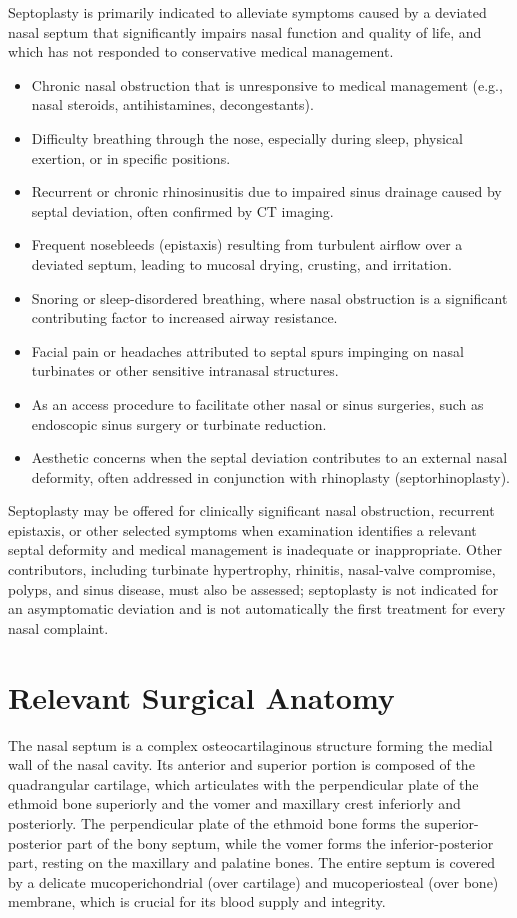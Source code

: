 Septoplasty is primarily indicated to alleviate symptoms caused by a deviated nasal septum that significantly impairs nasal function and quality of life, and which has not responded to conservative medical management.

\begin{itemize}
  \item Chronic nasal obstruction that is unresponsive to medical management (e.g., nasal steroids, antihistamines, decongestants).
  \item Difficulty breathing through the nose, especially during sleep, physical exertion, or in specific positions.
  \item Recurrent or chronic rhinosinusitis due to impaired sinus drainage caused by septal deviation, often confirmed by CT imaging.
  \item Frequent nosebleeds (epistaxis) resulting from turbulent airflow over a deviated septum, leading to mucosal drying, crusting, and irritation.
  \item Snoring or sleep-disordered breathing, where nasal obstruction is a significant contributing factor to increased airway resistance.
  \item Facial pain or headaches attributed to septal spurs impinging on nasal turbinates or other sensitive intranasal structures.
  \item As an access procedure to facilitate other nasal or sinus surgeries, such as endoscopic sinus surgery or turbinate reduction.
  \item Aesthetic concerns when the septal deviation contributes to an external nasal deformity, often addressed in conjunction with rhinoplasty (septorhinoplasty).
\end{itemize}

Septoplasty may be offered for clinically significant nasal obstruction, recurrent epistaxis, or other selected symptoms when examination identifies a relevant septal deformity and medical management is inadequate or inappropriate. Other contributors, including turbinate hypertrophy, rhinitis, nasal-valve compromise, polyps, and sinus disease, must also be assessed; septoplasty is not indicated for an asymptomatic deviation and is not automatically the first treatment for every nasal complaint.

\section*{Relevant Surgical Anatomy}
The nasal septum is a complex osteocartilaginous structure forming the medial wall of the nasal cavity. Its anterior and superior portion is composed of the quadrangular cartilage, which articulates with the perpendicular plate of the ethmoid bone superiorly and the vomer and maxillary crest inferiorly and posteriorly. The perpendicular plate of the ethmoid bone forms the superior-posterior part of the bony septum, while the vomer forms the inferior-posterior part, resting on the maxillary and palatine bones. The entire septum is covered by a delicate mucoperichondrial (over cartilage) and mucoperiosteal (over bone) membrane, which is crucial for its blood supply and integrity.


